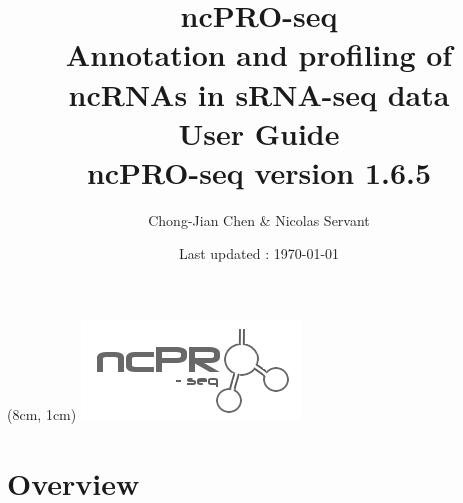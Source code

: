 \documentclass[12pt]{article}
\title{\vspace{7cm}\textbf{ncPRO-seq}\\\normalsize  Annotation and profiling of ncRNAs in sRNA-seq data\\\vspace{1cm}\large{\bf{User Guide}}\\\vspace{1cm} \normalsize ncPRO-seq version 1.6.5}
\date{\normalsize Last updated : \today}
\author{Chong-Jian Chen \& Nicolas Servant}
\begin{document}
\begin{titlepage}
\begin{center}
\begin{textblock*}{3cm}(8cm, 1cm)
\includegraphics[scale=0.8]{pic/ncPRO_logo.png}
\end{textblock*}
\end{center}
\end{titlepage}

\maketitle
\newpage

\tableofcontents
\clearpage
\section{Overview}
\end{document}

